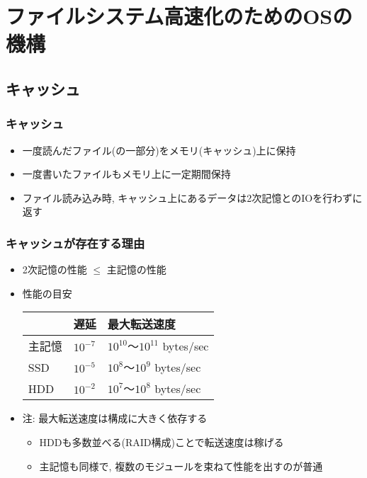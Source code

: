 \documentclass[12pt,dvipdfmx]{beamer}
\begin{document}
\section{ファイルシステム高速化のためのOSの機構}

\subsection{キャッシュ}

\begin{frame}
  \frametitle{キャッシュ}
  \begin{itemize}
  \item 一度読んだファイル(の一部分)をメモリ(キャッシュ)上に保持
  \item 一度書いたファイルもメモリ上に一定期間保持
  \item ファイル読み込み時,
    キャッシュ上にあるデータは2次記憶とのIOを行わずに返す
  \end{itemize}
\end{frame}

\begin{frame}
  \frametitle{キャッシュが存在する理由}
  \begin{itemize}
  \item 2次記憶の性能 $\leq$ 主記憶の性能
  \item 性能の目安

    \begin{tabular}{|l|l|l|}\hline
             & 遅延     & 最大転送速度    \\\hline
      主記憶 & $10^{-7}$ & $10^{10}$〜$10^{11}$ bytes/sec \\
      SSD    & $10^{-5}$ & $10^{8}$〜$10^{9}$ bytes/sec \\
      HDD    & $10^{-2}$ & $10^{7}$〜$10^{8}$ bytes/sec \\\hline
    \end{tabular}
  \item 注: 最大転送速度は構成に大きく依存する
    \begin{itemize}
    \item HDDも多数並べる(RAID構成)ことで転送速度は稼げる
    \item 主記憶も同様で, 複数のモジュールを束ねて性能を出すのが普通
    \end{itemize}
  \end{itemize}
\end{frame}
\end{document}
